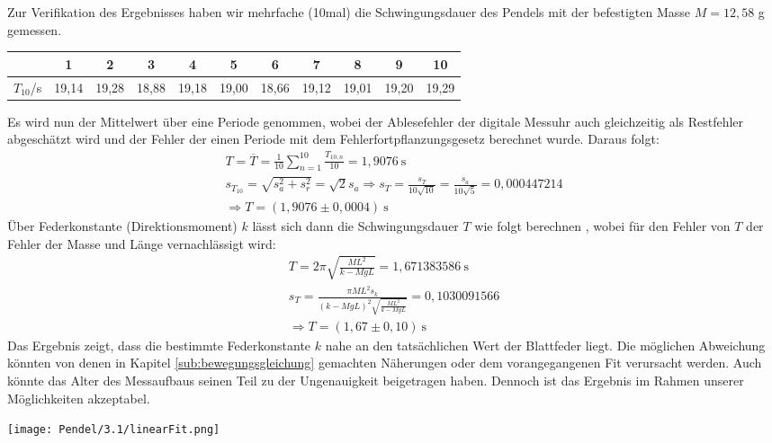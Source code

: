 Zur Verifikation des Ergebnisses haben wir mehrfache (10mal) die Schwingungsdauer des Pendels mit der befestigten Masse $M = 12,58$ g gemessen.
\begin{center}
    \begin{tabular}{ c | cccccccccc }
        {} & 1 & 2 & 3 &4 &5 &6 &7 &8 &9 &10\\
        \hline
        $T_10$/s&19,14&19,28&18,88&19,18&19,00&18,66&19,12&19,01&19,20&19,29\\
    \end{tabular}
    \label{tab:schwingung}
\end{center}
Es wird nun der Mittelwert über eine Periode genommen, wobei der Ablesefehler der digitale Messuhr auch gleichzeitig als Restfehler abgeschätzt wird und der Fehler der einen Periode mit dem Fehlerfortpflanzungsgesetz berechnet wurde. Daraus folgt:
\begin{gather}
    T = \overline{T} = \frac{1}{10} \sum_{n = 1}^{10} \frac{T_{10,n}}{10} = 1,9076~\text{s}\\
    s_{T_{10}} = \sqrt{s_a^2+s_r^2}=\sqrt{2}s_a \Rightarrow s_T = \frac{s_T}{10\sqrt{10}} = \frac{s_a}{10\sqrt{5}} = 0,000447214\\[0,5cm]
    \Rightarrow\boxed{T = (1,9076 \pm 0,0004)~\text{s}}
\end{gather}
\newpage
Über Federkonstante (Direktionsmoment) $k$ lässt sich dann die Schwingungsdauer $T$ wie folgt berechnen \citep{Leifi}, wobei für den Fehler von $T$ der Fehler der Masse und Länge vernachlässigt wird:
\begin{gather}
    T = 2\pi\sqrt{\frac{ML^2}{k- MgL}} = 1,671383586~\text{s}\\
    s_T = \frac{\pi ML^2 s_k}{(k-MgL)^2 \sqrt{\frac{ML^2}{k- MgL}}} = 0,1030091566\\[0,5cm]
    \Rightarrow\boxed{T = (1,67 \pm 0,10)~\text{s}}
\end{gather}
Das Ergebnis zeigt, dass die bestimmte Federkonstante $k$ nahe an den tatsächlichen Wert der Blattfeder liegt. Die möglichen Abweichung könnten von denen in Kapitel \ref{sub:bewegungsgleichung} gemachten Näherungen oder dem vorangegangenen Fit verursacht werden. Auch könnte das Alter des Messaufbaus seinen Teil zu der Ungenauigkeit beigetragen haben. Dennoch ist das Ergebnis im Rahmen unserer Möglichkeiten akzeptabel.
\newpage
\begin{center}
    \texttt{[image: Pendel/3.1/linearFit.png]}
    \label{image:linFit}
\end{center}
